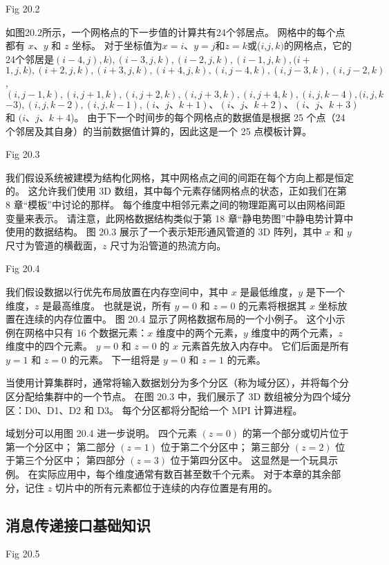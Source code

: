 {\color{red} Fig 20.2}

如图20.2所示，一个网格点的下一步值的计算共有24个邻居点。 网格中的每个点都有 $x、y$ 和 $z$ 坐标。 
对于坐标值为$x=i、y=j$和$z=k$或($i$,$j,k)$的网格点，它的24个邻居是$(i-4,j) , k),(i-3, j, k),(i-2, j, k),(i-1, j, k),(i+$ $1, j, k),(i+2, j , k),(i+3, j, k),(i+4, j, k),(i, j-4, k),(i, j-3, k),(i, j-2 , k)$, $(i, j-1, k),(i, j+1, k),(i, j+2, k),(i, j+3, k),(i, j +4, k),(i, j, k-4),(i, j, k$ $-3),(i, j, k-2),(i, j, k-1),(i 、j、k+1)、(i、j、k+2)、(i、j、k+3)$ 和 $(i、j、k+$4)。 
由于下一个时间步的每个网格点的数据值是根据 25 个点（24 个邻居及其自身）的当前数据值计算的，因此这是一个 25 点模板计算。

{\color{red} Fig 20.3}

我们假设系统被建模为结构化网格，其中网格点之间的间距在每个方向上都是恒定的。 
这允许我们使用 3D 数组，其中每个元素存储网格点的状态，正如我们在第 8 章“模板”中讨论的那样。 
每个维度中相邻元素之间的物理距离可以由网格间距变量来表示。 
请注意，此网格数据结构类似于第 18 章“静电势图”中静电势计算中使用的数据结构。 
图 20.3 展示了一个表示矩形通风管道的 3D 阵列，其中 $x$ 和 $y$ 尺寸为管道的横截面，$z$ 尺寸为沿管道的热流方向。

{\color{red} Fig 20.4}

我们假设数据以行优先布局放置在内存空间中，其中 $x$ 是最低维度，$y$ 是下一个维度，$z$ 是最高维度。 
也就是说，所有 $y=0$ 和 $z=0$ 的元素将根据其 $x$ 坐标放置在连续的内存位置中。 图 20.4 显示了网格数据布局的一个小例子。 
这个小示例在网格中只有 16 个数据元素：$x$ 维度中的两个元素，$y$ 维度中的两个元素，$z$ 维度中的四个元素。 
$y=0$ 和 $z=0$ 的 $x$ 元素首先放入内存中。 它们后面是所有 $y=1$ 和 $z=0$ 的元素。 
下一组将是 $y=0$ 和 $z=1$ 的元素。

当使用计算集群时，通常将输入数据划分为多个分区（称为域分区），并将每个分区分配给集群中的一个节点。 
在图 20.3 中，我们展示了 3D 数组被分为四个域分区：D0、D1、D2 和 D3。 每个分区都将分配给一个 MPI 计算进程。

域划分可以用图 20.4 进一步说明。 四个元素 $(z=0)$ 的第一个部分或切片位于第一个分区中； 
第二部分 $(z=1)$ 位于第二个分区中； 第三部分 $(z=2)$ 位于第三个分区中； 第四部分 $(z=3)$ 位于第四分区中。 
这显然是一个玩具示例。 在实际应用中，每个维度通常有数百甚至数千个元素。 
对于本章的其余部分，记住 $z$ 切片中的所有元素都位于连续的内存位置是有用的。

\subsection{消息传递接口基础知识}
{\color{red} Fig 20.5}

